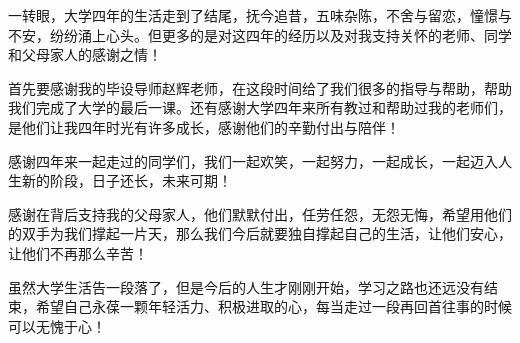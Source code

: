 \begin{thanksfor}
一转眼，大学四年的生活走到了结尾，抚今追昔，五味杂陈，不舍与留恋，憧憬与不安，纷纷涌上心头。但更多的是对这四年的经历以及对我支持关怀的老师、同学和父母家人的感谢之情！

首先要感谢我的毕设导师赵辉老师，在这段时间给了我们很多的指导与帮助，帮助我们完成了大学的最后一课。还有感谢大学四年来所有教过和帮助过我的老师们，是他们让我四年时光有许多成长，感谢他们的辛勤付出与陪伴！

感谢四年来一起走过的同学们，我们一起欢笑，一起努力，一起成长，一起迈入人生新的阶段，日子还长，未来可期！

感谢在背后支持我的父母家人，他们默默付出，任劳任怨，无怨无悔，希望用他们的双手为我们撑起一片天，那么我们今后就要独自撑起自己的生活，让他们安心，让他们不再那么辛苦！

虽然大学生活告一段落了，但是今后的人生才刚刚开始，学习之路也还远没有结束，希望自己永葆一颗年轻活力、积极进取的心，每当走过一段再回首往事的时候可以无愧于心！
\end{thanksfor}